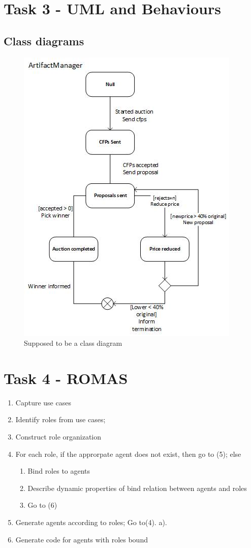 \documentclass[a4paper, 11pt]{article}
\begin{document}
\section{Task 3 - UML and Behaviours}
\subsection{Class diagrams}

\begin{figure}[H]
	\caption{Supposed to be a class diagram}
	\centering
	\includegraphics[scale=0.9]{./images/artifactmanagerUML.jpg}
\end{figure}

\section{Task 4 - ROMAS}
\begin{enumerate}
\item Capture use cases
\item Identify roles from use cases;
\item Construct role organization
\item For each role, if the approrpate agent does not exist, then go to (5); else
\begin{enumerate}
\item Bind roles to agents
\item Describe dynamic properties of bind relation between agents and roles
\item Go to (6)
\end{enumerate}
\item Generate agents according to roles; Go to(4). a).
\item Generate code for agents with roles bound
\end{enumerate}
\end{document}
